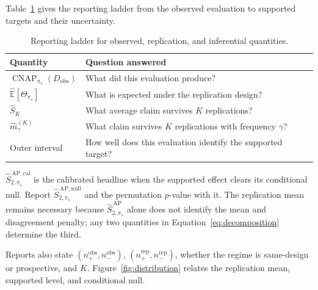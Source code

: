 \documentclass[11pt]{article}
\newcommand{\CNAP}{\operatorname{CNAP}}
\newcommand{\Tpi}{\CNAP_{\pi_\star}}
\newcommand{\E}{\mathbb{E}}
\newcommand{\SAPHat}{\widehat S_{2,\pi_\star}^{\,\mathrm{AP}}}
\newcommand{\SAPnullHat}{\widehat S_{2,\pi_\star}^{\,\mathrm{AP,null}}}
\newcommand{\SAPcalHat}{\widehat S_{2,\pi_\star}^{\,\mathrm{AP,cal}}}
\theoremstyle{remark}
\begin{document}
Table~\ref{tab:ladder} gives the reporting ladder from the observed evaluation to supported targets and their uncertainty.

\begin{table}[ht]
\centering
\caption{Reporting ladder for observed, replication, and inferential quantities.}
\label{tab:ladder}
\begin{tabularx}{\textwidth}{@{}>{\raggedright\arraybackslash}p{}>{\raggedright\arraybackslash}X@{}}
\toprule
Quantity & Question answered \\
\midrule
$\Tpi(D_{\mathrm{obs}})$ & What did this evaluation produce? \\
$\widehat{\E}[\Theta_{\pi_\star}]$ & What is expected under the replication design? \\
$\widehat S_K$ & What average claim survives $K$ replications? \\
$\widehat m_\gamma^{(K)}$ & What claim survives $K$ replications with frequency $\gamma$? \\
Outer interval & How well does this evaluation identify the supported target? \\
\bottomrule
\end{tabularx}
\end{table}

$\SAPcalHat$ is the calibrated headline when the supported effect clears its conditional null. Report $\SAPnullHat$ and the permutation $p$-value with it. The replication mean remains necessary because $\SAPHat$ alone does not identify the mean and disagreement penalty; any two quantities in Equation~\eqref{eq:decomposition} determine the third.

Reports also state $(n_+^{\mathrm{obs}},n_-^{\mathrm{obs}})$, $(n_+^{\mathrm{rep}},n_-^{\mathrm{rep}})$, whether the regime is same-design or prospective, and $K$. Figure~\ref{fig:distribution} relates the replication mean, supported level, and conditional null.
\end{document}
